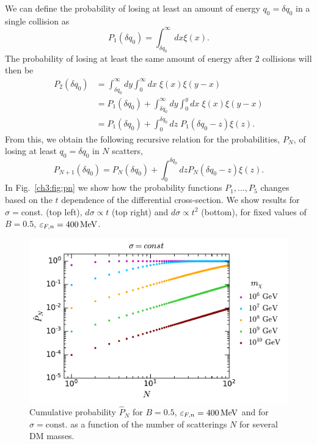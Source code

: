 We can define the probability of losing at least an amount of energy $q_0 = \delta q_0$ in a single collision as
\begin{equation}
    P_1(\delta q_0) = \int_{\delta q_0}^\infty dx \xi(x).
    \label{ch3:eq:P1}
\end{equation}
The probability of losing at least the same amount of energy after 2 collisions will then be
\begin{align}
 P_2(\delta q_0) &= \int_{\delta q_0}^\infty dy \int_0^\infty dx\;\xi(x) \xi(y-x)\\
    & =  P_1(\delta q_0) + \int_{\delta q_0}^\infty dy \int_0^y dx\; \xi(x)\xi(y-x)\\
    & = P_1(\delta q_0) + \int_0^{\delta q_0} dz \;P_1(\delta q_0-z)\xi(z).
\end{align}
From this, we obtain the following recursive relation for the probabilities, $P_N$, of losing at least $q_0 = \delta q_0$ in $N$ scatters,
\begin{equation}
 P_{N+1}(\delta q_0) = P_N(\delta q_0) + \int_0^{\delta q_0} dz P_N(\delta q_0-z)\xi(z).\label{ch3:eq:pnrecurrent}
\end{equation} 
In Fig.~\ref{ch3:fig:pn} we show how the probability functions $P_1,...,P_5$ changes based on the $t$ dependence of the differential cross-section. We show results for $\sigma=$const. (top left), $d\sigma\propto t$ (top right) and $d\sigma\propto t^2$ (bottom), for fixed values of $B=0.5$, $\kinFn=400\MeV$.

\begin{figure}
    \centering
    \includegraphics[width=.6\textwidth]{capture_1/cumprobN_n0.pdf}
    \caption[Cumulative probability $\hat{P}_N$ for $B=0.5$,  $\kinFn=400\MeV$ and for $\sigma = \mathrm{const.}$ as a function of the number of scatterings $N$ for several DM masses.]{Cumulative probability $\hat{P}_N$ for $B=0.5$,  $\kinFn=400\MeV$ and for $\sigma = \mathrm{const.}$ as a function of the number of scatterings $N$ for several DM masses.}
    \label{ch3:fig:pnofn}
\end{figure}

